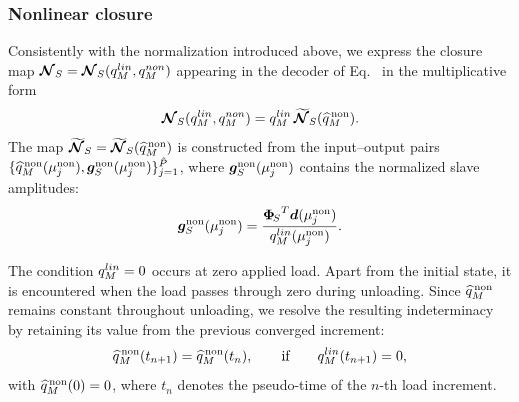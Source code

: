 \documentclass[preprint,10pt]{elsarticle}  %
\begin{document}
\subsubsection{Nonlinear closure}
\label{sec:nonlinearclosure2}
Consistently with the normalization introduced above, we express the
closure map \(\boldsymbol{\mathcal{N}}_{S}=\boldsymbol{\mathcal{N}}_{S}({q}_M^{lin},{q}_M^{non})\) appearing in the decoder
of Eq.~ in the multiplicative form
\begin{equation}
\label{eq:nslave_map}
\boldsymbol{\mathcal{N}}_{S}({q}_M^{lin},{q}_M^{non})
=
{q}_M^{lin}\,\boldsymbol{\mathcal{\widetilde{N}}}_{S}(\widehat{q}^{\mathrm{\,non}}_{M}).
\end{equation}
The map \(\boldsymbol{\mathcal{\widetilde{N}}}_{S}=\boldsymbol{\mathcal{\widetilde{N}}}_{S}(\widehat{q}^{\mathrm{\,non}}_{M})\) is constructed from the
input--output pairs  $\{\widehat{q}^{\mathrm{\,non}}_{M}(\mu_{j}^{\mathrm{non}}), \bm{g}_{S}^{\mathrm{non}}(\mu_{j}^{\mathrm{non}})\}_{j=1}^{\hat{P}}$, where $\bm{g}_{S}^{\mathrm{non}}(\mu_{j}^{\mathrm{non}})$ contains the normalized slave amplitudes:
\begin{equation}
\label{eq:gSnon_snap}
\bm{g}_{S}^{\mathrm{non}}(\mu_{j}^{\mathrm{non}})
=
\dfrac{{\bm{\Phi}_{\!S}}^{T}\bm{d}(\mu_{j}^{\mathrm{non}})}
{{q}_M^{lin}(\mu_{j}^{\mathrm{non}})}.
\end{equation}


The condition \({q}_M^{lin}=0\) occurs at zero applied load. Apart from the
initial state, it is encountered when the load passes through zero during
unloading. Since \(\widehat{q}^{\mathrm{\,non}}_{M}\) remains constant throughout unloading, we
resolve the resulting indeterminacy by retaining its value from the
previous converged increment:
\begin{equation}
\label{eq:qMnonrel_zero}
\widehat{q}^{\mathrm{\,non}}_{M}(t_{n+1})
=
\widehat{q}^{\mathrm{\,non}}_{M}(t_n),
\qquad
\text{if}
\qquad
{q}_M^{lin}(t_{n+1})=0,
\end{equation}
with \(\widehat{q}^{\mathrm{\,non}}_{M}(0)=0\), where \(t_n\) denotes the pseudo-time of the
\(n\)-th load increment.
\end{document}
